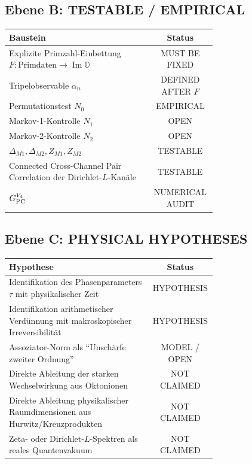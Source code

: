 \documentclass[11pt,a4paper]{article}
\newcommand{\OO}{\mathbb O}
\begin{document}
\subsection*{Ebene B: TESTABLE / EMPIRICAL}
\begin{center}
\begin{tabular}{>{\raggedright\arraybackslash}p{0.69\linewidth}|c}
\toprule
\textbf{Baustein} & \textbf{Status}\\
\midrule
Explizite Primzahl-Einbettung $F:\text{Primdaten}\to\operatorname{Im}\OO$ & MUST BE FIXED\\
Tripelobservable $\alpha_n$ & DEFINED AFTER $F$\\
Permutationstest $N_0$ & EMPIRICAL\\
Markov-1-Kontrolle $N_1$ & OPEN\\
Markov-2-Kontrolle $N_2$ & OPEN\\
$\Delta_{M1},\Delta_{M2},Z_{M1},Z_{M2}$ & TESTABLE\\
Connected Cross-Channel Pair Correlation der Dirichlet-$L$-Kanäle & TESTABLE\\
$G_{\rm PC}^{V_4}$ & NUMERICAL AUDIT\\
\bottomrule
\end{tabular}
\end{center}

\subsection*{Ebene C: PHYSICAL HYPOTHESES}
\begin{center}
\begin{tabular}{>{\raggedright\arraybackslash}p{0.69\linewidth}|c}
\toprule
\textbf{Hypothese} & \textbf{Status}\\
\midrule
Identifikation des Phasenparameters $\tau$ mit physikalischer Zeit & HYPOTHESIS\\
Identifikation arithmetischer Verdünnung mit makroskopischer Irreversibilität & HYPOTHESIS\\
Assoziator-Norm als ``Unschärfe zweiter Ordnung'' & MODEL / OPEN\\
Direkte Ableitung der starken Wechselwirkung aus Oktonionen & NOT CLAIMED\\
Direkte Ableitung physikalischer Raumdimensionen aus Hurwitz/Kreuzprodukten & NOT CLAIMED\\
Zeta- oder Dirichlet-$L$-Spektren als reales Quantenvakuum & NOT CLAIMED\\
\bottomrule
\end{tabular}
\end{center}
\end{document}
